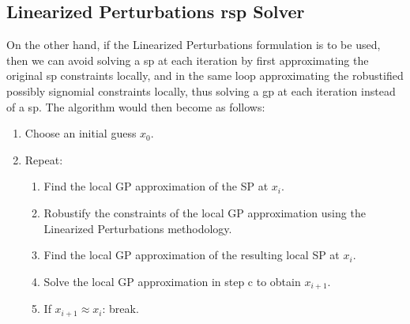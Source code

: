 \subsection{Linearized Perturbations \gls{rsp} Solver}

On the other hand, if the Linearized Perturbations formulation is to be used,
then we can avoid solving a \gls{sp} at each iteration by first
approximating the original \gls{sp} constraints locally, and in the same loop approximating
the robustified possibly signomial constraints locally, thus solving a
\gls{gp} at each iteration instead of a \gls{sp}. The algorithm would then become as follows:

\begin{enumerate}
    \item Choose an initial guess $x_0$.
    \item Repeat:
    \begin{enumerate}
        \item Find the local GP approximation of the SP at $x_i$.
        \item Robustify the constraints of the local GP approximation using the Linearized Perturbations methodology.
        \item Find the local GP approximation of the resulting local SP at $x_i$.
        \item Solve the local GP approximation in step c to obtain $x_{i+1}$.
        \item If $x_{i+1} \approx x_{i}$: break.
    \end{enumerate}
\end{enumerate}

